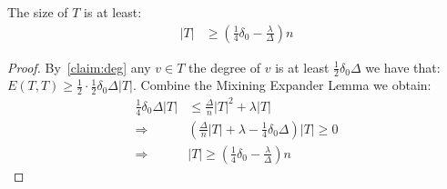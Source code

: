 \documentclass[manuscript,screen,review]{acmart}
\begin{document}
  \begin{claim} \label{claim:tree-size} The size of $T$ is at least:
  \begin{equation*}
    \begin{split}
      |T| & \ge \left( \frac{1}{4}\delta_{0} - \frac{\lambda}{\Delta} \right)n 
    \end{split}
  \end{equation*}
\end{claim}
\begin{proof}By~\cref{claim:deg}  any $v \in T$ the degree of $v$ is at least $\frac{1}{2}\delta_{0}\Delta$ we have that: $E\left( T,T \right) \ge \frac{1}{2}\cdot \frac{1}{2}\delta_{0}\Delta |T|$. Combine the Mixining Expander Lemma we obtain:
  \begin{equation*}
    \begin{split}
      \frac{1}{4}\delta_{0}\Delta |T| & \le \frac{\Delta}{n}|T|^2  + \lambda|T| \\ 
      \Rightarrow & \left( \frac{\Delta}{n}|T| + \lambda -  \frac{1}{4}\delta_{0}\Delta \right)|T| \ge 0 \\ 
      \Rightarrow & |T| \ge \left( \frac{1}{4}\delta_{0} - \frac{\lambda}{\Delta} \right)n 
    \end{split}
  \end{equation*}
  \end{proof}
   
   
   
   
\printbibliography 
\end{document}
